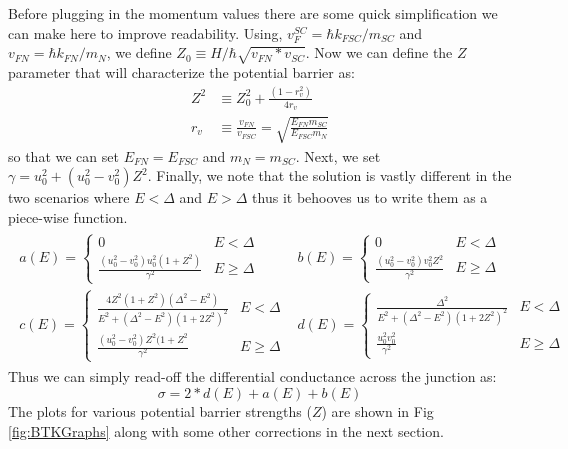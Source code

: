 Before plugging in the momentum values there are some quick simplification we can make here to improve readability. Using, $v_{F}^{SC}=\hbar k_{FSC}/m_{SC}$ and $v_{FN}=\hbar k_{FN}/m_{N}$, we define $Z_{0}\equiv H/\hbar\sqrt{v_{FN}*v_{SC}}$. Now we can define the $Z$ parameter that will characterize the potential barrier as:
\begin{align}
    Z^{2}&\equiv Z_{0}^{2}+\frac{(1-r_{v}^{2})}{4r_{v}}\\
    r_{v}&\equiv\frac{v_{FN}}{v_{FSC}}=\sqrt{\frac{E_{FN}m_{SC}}{E_{FSC}m_{N}}}
\end{align}
so that we can set $E_{FN}=E_{FSC}$ and $m_{N}=m_{SC}$. Next, we set $\gamma=u_{0}^{2}+(u_{0}^{2}-v_{0}^{2})Z^{2}$. Finally, we note that the solution is vastly different in the two scenarios where $E<\Delta$ and $E>\Delta$ thus it behooves us to write them as a piece-wise function.
\begin{align}
    \begin{matrix}
    a(E)=\begin{cases}
    0 & E<\Delta\\
    \frac{(u_{0}^{2}-v_{0}^{2})u_{0}^{2}(1+Z^{2})}{\gamma^{2}} & E\geq\Delta\end{cases} &
    b(E)=\begin{cases}
    0 & E<\Delta\\
    \frac{(u_{0}^{2}-v_{0}^{2})v_{0}^{2}Z^{2}}{\gamma^{2}} & E\geq\Delta
    \end{cases}\\
    c(E)=\begin{cases}
    \frac{4Z^{2}(1+Z^{2})(\Delta^{2}-E^{2})}{E^{2}+(\Delta^{2}-E^{2})(1+2Z^{2})^{2}} & E<\Delta\\
    \frac{(u_{0}^{2}-v_{0}^{2})Z^{2}(1+Z^{2}}{\gamma^{2}} & E\geq\Delta
    \end{cases} &
    d(E)=\begin{cases}
    \frac{\Delta^{2}}{E^{2}+(\Delta^{2}-E^{2})(1+2Z^{2})^{2}} & E<\Delta\\
    \frac{u_{0}^{2}v_{0}^{2}}{\gamma^{2}} & E\geq\Delta
    \end{cases}
    \end{matrix}
\end{align}
Thus we can simply read-off the differential conductance across the junction as:
\[
\sigma = 2*d(E)+a(E)+b(E)
\]
The plots for various potential barrier strengths ($Z$) are shown in Fig \ref{fig:BTKGraphs} along with some other corrections in the next section.

